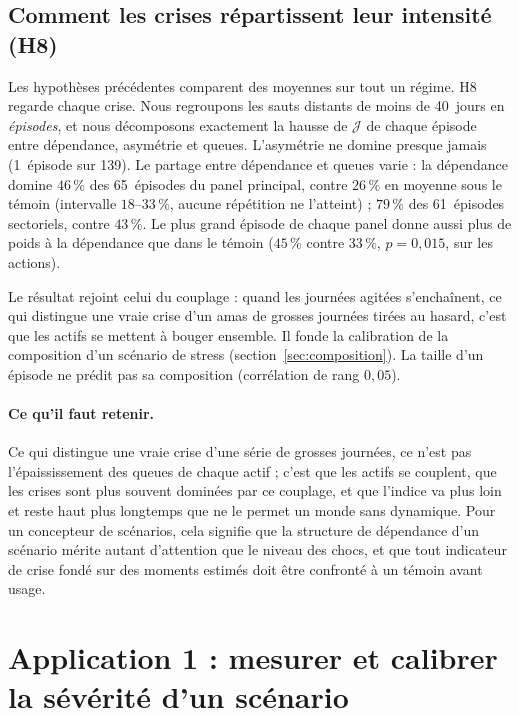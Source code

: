 \documentclass[11pt]{article}
\theoremstyle{definition}
\newcommand{\JJ}{\mathcal{J}}
\begin{document}
\subsection{Comment les crises répartissent leur intensité (H8)}
\label{sec:h8}

Les hypothèses précédentes comparent des moyennes sur tout un régime. H8 regarde
chaque crise. Nous regroupons les sauts distants de moins de 40~jours en
\emph{épisodes}, et nous décomposons exactement la hausse de $\JJ$ de chaque
épisode entre dépendance, asymétrie et queues. L'asymétrie ne domine presque
jamais (1~épisode sur 139). Le partage entre dépendance et queues varie : la
dépendance domine $46\,\%$ des 65~épisodes du panel principal, contre $26\,\%$
en moyenne sous le témoin (intervalle $18$--$33\,\%$, aucune répétition ne
l'atteint) ; $79\,\%$ des 61~épisodes sectoriels, contre $43\,\%$. Le plus
grand épisode de chaque panel donne aussi plus de poids à la dépendance que
dans le témoin ($45\,\%$ contre $33\,\%$, $p=0{,}015$, sur les actions).

Le résultat rejoint celui du couplage : quand les journées agitées
s'enchaînent, ce qui distingue une vraie crise d'un amas de grosses journées
tirées au hasard, c'est que les actifs se mettent à bouger ensemble. Il
fonde la calibration de la composition d'un scénario de stress
(section~\ref{sec:composition}). La taille d'un épisode ne prédit pas sa
composition (corrélation de rang $0{,}05$).

\paragraph{Ce qu'il faut retenir.} Ce qui distingue une vraie crise d'une série
de grosses journées, ce n'est pas l'épaississement des queues de chaque actif ;
c'est que les actifs se couplent, que les crises sont plus souvent dominées
par ce couplage, et que l'indice va plus loin et reste haut plus longtemps
que ne le permet un monde sans dynamique. Pour un concepteur de scénarios, cela
signifie que la structure de dépendance d'un scénario mérite autant
d'attention que le niveau des chocs, et que tout indicateur de crise fondé sur
des moments estimés doit être confronté à un témoin avant usage.

\section{Application 1 : mesurer et calibrer la sévérité d'un scénario}
\label{sec:stress}
\end{document}
